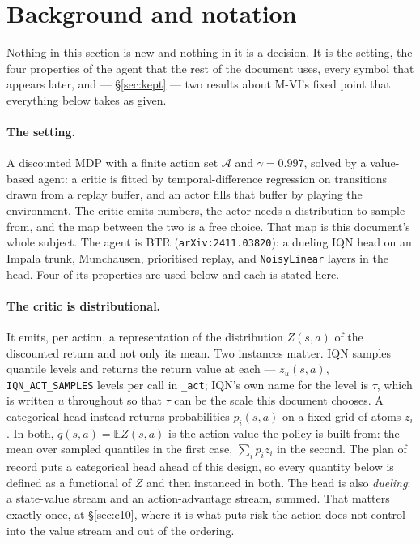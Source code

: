 \documentclass{article}
\newcommand{\actions}{\mathcal{A}}
\newcommand{\E}{\mathbb{E}}
\begin{document}
\section{Background and notation}
\label{sec:bg}

Nothing in this section is new and nothing in it is a decision. It is the setting, the four
properties of the agent that the rest of the document uses, every symbol that appears later, and
--- \S\ref{sec:kept} --- two results about M-VI's fixed point that everything below takes as
given.

\paragraph{The setting.} A discounted MDP with a finite action set $\actions$ and
$\gamma = 0.997$, solved by a value-based agent: a critic is fitted by temporal-difference
regression on transitions drawn from a replay buffer, and an actor fills that buffer by playing
the environment. The critic emits numbers, the actor needs a distribution to sample from, and the
map between the two is a free choice. That map is this document's whole subject. The agent is BTR
(\texttt{arXiv:2411.03820}): a dueling IQN head on an Impala trunk, Munchausen, prioritised
replay, and \texttt{NoisyLinear} layers in the head. Four of its properties are used below and
each is stated here.

\paragraph{The critic is distributional.} It emits, per action, a representation of the
distribution $Z(s,a)$ of the discounted return and not only its mean. Two instances matter. IQN
samples quantile levels and returns the return value at each --- $z_u(s,a)$,
\texttt{IQN\_ACT\_SAMPLES} levels per call in \texttt{\_act}; IQN's own name for the level is $\tau$, which is written $u$
throughout so that $\tau$ can be the scale this document chooses. A categorical head instead
returns probabilities $p_i(s,a)$ on a fixed grid of atoms $z_i$. In both,
$\tilde{q}(s,a) = \E Z(s,a)$ is the action value the policy is built from: the mean over sampled
quantiles in the first case, $\sum_i p_i z_i$ in the second. The plan of record puts a categorical
head ahead of this design, so every quantity below is defined as a functional of $Z$ and then
instanced in both. The head is also \emph{dueling}: a state-value stream and an
action-advantage stream, summed. That matters exactly once, at \S\ref{sec:c10}, where it is
what puts risk the action does not control into the value stream and out of the ordering.
\end{document}
